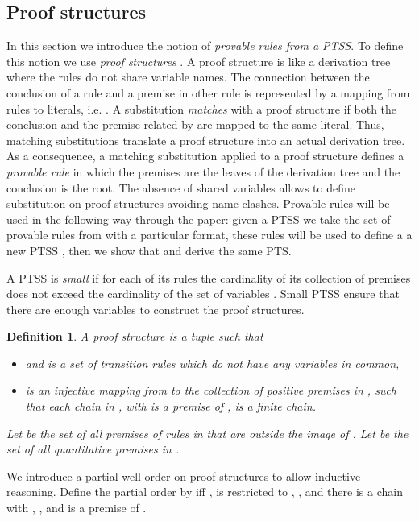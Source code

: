 \documentclass[submission,copyright,creativecommons]{eptcs}
\newtheorem{definition}{Definition}
\begin{document}
\subsection{Proof structures}\label{sec:proofStructure}


 In this section we introduce the notion of \emph{provable rules from a PTSS}.
To define this notion we use \emph{proof structures} \cite{FokkinkvanGlabbeek96}.
A proof structure is like a derivation tree where the rules do not share variable names. 
The connection between the conclusion of a rule  
 and a premise  in other rule is represented by a mapping  
 from rules to literals, i.e. .
A substitution \emph{matches} with a proof structure if both 
 the conclusion and the premise related by  are mapped to the same literal. 
Thus, matching substitutions translate a proof structure into an actual derivation tree.  As a consequence, a matching substitution applied to a proof structure defines a \emph{provable rule} in which the premises
 are the leaves of the derivation tree and the conclusion is the root.
The absence of shared variables allows to 
 define substitution on proof structures avoiding name clashes.
Provable rules will be used in the following way through the paper:  
 given a PTSS  we take the set of provable rules from  
 with a particular format, these rules will be used to define a 
 a new PTSS , then we show that  and  derive the same 
 PTS.

 A PTSS is \emph{small} if for each of its rules the cardinality of its collection of premises does not exceed the cardinality of the set of variables . Small PTSS ensure that there are enough variables to construct the proof structures.

\begin{definition}
 \label{def:proofStructure}
 A \emph{proof structure} is a tuple  such that 
\begin{itemize}
 \item  and  is a set of transition rules which do not have any variables in common,
 \item  is an injective mapping from  to the collection of positive premises in , 
          such that each chain  in , with  is a premise of ,
          is a finite chain. 
\end{itemize}
Let  be the set of all premises of rules in  that are outside the image of . Let   be the set of all quantitative premises in  .
\end{definition}

We introduce a partial well-order  on proof structures to allow inductive reasoning. Define the partial order  by
 iff 
  , 
   is  restricted to ,
  ,
and there is a chain  with 
  , ,  and  is a premise of .
\end{document}
